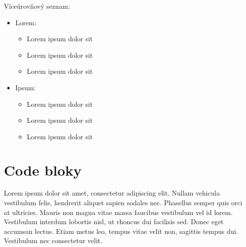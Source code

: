 \vspace{0.5cm} %
\noindent Víceúrovňový seznam: 
\begin{itemize}[noitemsep]
    \item Lorem:
    \begin{itemize}[noitemsep]
        \item Lorem ipsum dolor sit
        \item Lorem ipsum dolor sit
        \item Lorem ipsum dolor sit
    \end{itemize}
    \item Ipsum:
    \begin{itemize}[noitemsep]
        \item Lorem ipsum dolor sit
        \item Lorem ipsum dolor sit
        \item Lorem ipsum dolor sit
    \end{itemize}
\end{itemize}

\newpage %

\section{Code bloky}
Lorem ipsum dolor sit amet, consectetur adipiscing elit. Nullam vehicula vestibulum felis, hendrerit aliquet sapien sodales nec. Phasellus semper quis orci at ultricies. Mauris non magna vitae massa faucibus vestibulum vel id lorem. Vestibulum interdum lobortis nisl, ut rhoncus dui facilisis sed. Donec eget accumsan lectus. Etiam metus leo, tempus vitae velit non, sagittis tempus dui. Vestibulum nec consectetur velit.

